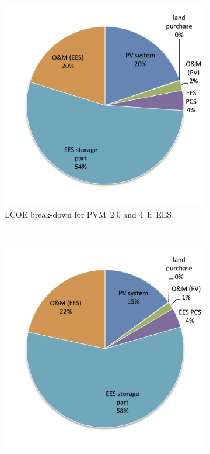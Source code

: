 \begin{figure}[!htbp]
        \centering                
        \begin{subfigure}[b]{0.5\textwidth}
                \centering
                \includegraphics[width=1\textwidth]{FIG/PV_LCOE_lowinvest_BreakDown}
                \caption{LCOE break-down for PVM~2.0 and 4~h~EES.}\label{PV_LCOE_lowinvest_BreakDown}
        \end{subfigure}%
        ~
        \begin{subfigure}[b]{0.5\textwidth}
                \centering
                \includegraphics[width=1\textwidth]{FIG/PV_LCOE_highinvest_BreakDown}

\end{subfigure}
\end{figure}
